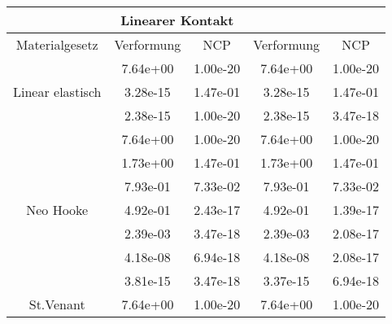 \begin{table} 
\centering 
\begin{tabular}{c|cc|cc|} 
\cline{2-5} 
 & \multicolumn{2}{|c|}{Linearer Kontakt} &  \\ 
\hline 
\multicolumn{1}{|c|}{Materialgesetz} & \multicolumn{1}{c|}{Verformung} & \multicolumn{1}{c|}{NCP} & \multicolumn{1}{c|}{Verformung} & \multicolumn{1}{c|}{NCP} \\ 
\hline 
\multicolumn{1}{|c|}{\multirow{3}{*}{Linear elastisch}} &\multicolumn{1}{|c|}{  7.64e+00} & \multicolumn{1}{|c|}{  1.00e-20} & \multicolumn{1}{|c|}{  7.64e+00} & \multicolumn{1}{|c|}{  1.00e-20} \\ 
\multicolumn{1}{|c|}{} & \multicolumn{1}{|c|}{  3.28e-15} & \multicolumn{1}{|c|}{  1.47e-01} & \multicolumn{1}{|c|}{  3.28e-15} & \multicolumn{1}{|c|}{  1.47e-01} \\ 
\multicolumn{1}{|c|}{} & \multicolumn{1}{|c|}{  2.38e-15} & \multicolumn{1}{|c|}{  1.00e-20} & \multicolumn{1}{|c|}{  2.38e-15} & \multicolumn{1}{|c|}{  3.47e-18} \\ 
\hline 
\multicolumn{1}{|c|}{\multirow{7}{*}{Neo Hooke}} &\multicolumn{1}{|c|}{  7.64e+00} & \multicolumn{1}{|c|}{  1.00e-20} & \multicolumn{1}{|c|}{  7.64e+00} & \multicolumn{1}{|c|}{  1.00e-20} \\ 
\multicolumn{1}{|c|}{} & \multicolumn{1}{|c|}{  1.73e+00} & \multicolumn{1}{|c|}{  1.47e-01} & \multicolumn{1}{|c|}{  1.73e+00} & \multicolumn{1}{|c|}{  1.47e-01} \\ 
\multicolumn{1}{|c|}{} & \multicolumn{1}{|c|}{  7.93e-01} & \multicolumn{1}{|c|}{  7.33e-02} & \multicolumn{1}{|c|}{  7.93e-01} & \multicolumn{1}{|c|}{  7.33e-02} \\ 
\multicolumn{1}{|c|}{} & \multicolumn{1}{|c|}{  4.92e-01} & \multicolumn{1}{|c|}{  2.43e-17} & \multicolumn{1}{|c|}{  4.92e-01} & \multicolumn{1}{|c|}{  1.39e-17} \\ 
\multicolumn{1}{|c|}{} & \multicolumn{1}{|c|}{  2.39e-03} & \multicolumn{1}{|c|}{  3.47e-18} & \multicolumn{1}{|c|}{  2.39e-03} & \multicolumn{1}{|c|}{  2.08e-17} \\ 
\multicolumn{1}{|c|}{} & \multicolumn{1}{|c|}{  4.18e-08} & \multicolumn{1}{|c|}{  6.94e-18} & \multicolumn{1}{|c|}{  4.18e-08} & \multicolumn{1}{|c|}{  2.08e-17} \\ 
\multicolumn{1}{|c|}{} & \multicolumn{1}{|c|}{  3.81e-15} & \multicolumn{1}{|c|}{  3.47e-18} & \multicolumn{1}{|c|}{  3.37e-15} & \multicolumn{1}{|c|}{  6.94e-18} \\ 
\hline 
\multicolumn{1}{|c|}{\multirow{6}{*}{St.Venant}} &\multicolumn{1}{|c|}{  7.64e+00} & \multicolumn{1}{|c|}{  1.00e-20} & \multicolumn{1}{|c|}{  7.64e+00} & \multicolumn{1}{|c|}{  1.00e-20} \\ 

\end{tabular}
\end{table}
